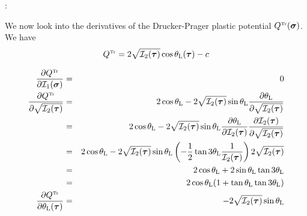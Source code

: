 \Literature: 

\vspace{.5cm}

We now look into the derivatives of the Drucker-Prager plastic potential $Q^{\text{\tiny Tr}}(\bm\sigma)$.
We have
\[
Q^{\text{\tiny Tr}}=2\sqrt{ {\cal I}_2({\bm \tau})  } \cos \theta_{\rm L}(\bm\tau) - c
\]

\begin{eqnarray}
\frac{\partial Q^{\text{\tiny Tr}}    }{\partial {\cal I}_1(\bm\sigma)} 
&=& 0 \\
\frac{\partial Q^{\text{\tiny Tr}}    }{\partial \sqrt {{\cal I}_2(\bm\tau)}}
&=& 2 \cos\theta_{\rm L} - 2 \sqrt{ {\cal I}_2({\bm \tau})  } \sin\theta_{\rm L}  
\frac{\partial\theta_{\rm L}}{\partial \sqrt{{\cal I}_2(\bm\tau)}} \nonumber\\
&=& 2 \cos\theta_{\rm L} - 2 \sqrt{ {\cal I}_2({\bm \tau})  } \sin\theta_{\rm L}  
\frac{\partial\theta_{\rm L}}{\partial {{\cal I}_2(\bm\tau)}} 
\frac{\partial {{\cal I}_2(\bm\tau)}}{\partial \sqrt{{\cal I}_2(\bm\tau)}}
\nonumber\\
&=& 2 \cos\theta_{\rm L} - 2 \sqrt{ {\cal I}_2({\bm \tau})  } \sin\theta_{\rm L}  
\left( -\frac12 \tan 3\theta_{\rm L} \frac{1}{ {\cal I}_2(\bm\tau)}  \right)
2 \sqrt{{\cal I}_2(\bm\tau)}
\nonumber\\
&=& 2 \cos\theta_{\rm L} +  2 \sin\theta_{\rm L}  
\tan 3\theta_{\rm L} 
\nonumber\\
&=& 2 \cos\theta_{\rm L} ( 1 + \tan\theta_{\rm L}  \tan 3\theta_{\rm L}) \\
\frac{\partial Q^{\text{\tiny Tr}} }{\partial \theta_{\rm L}(\bm\tau)} 
&=& 
-2\sqrt{ {\cal I}_2({\bm \tau})  } \sin \theta_{\rm L} 
\end{eqnarray}


